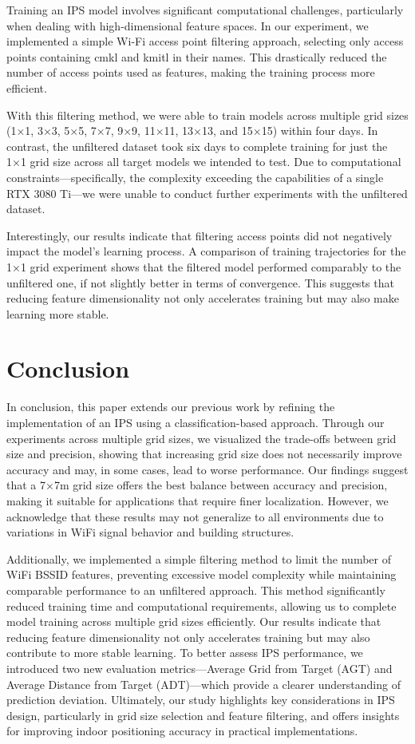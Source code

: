 \documentclass[conference]{IEEEtran}
\begin{document}
	Training an IPS model involves significant computational challenges, particularly when dealing with high-dimensional feature spaces. In our experiment, we implemented a simple Wi-Fi access point filtering approach, selecting only access points containing cmkl and kmitl in their names. This drastically reduced the number of access points used as features, making the training process more efficient.
	
	With this filtering method, we were able to train models across multiple grid sizes (1×1, 3×3, 5×5, 7×7, 9×9, 11×11, 13×13, and 15×15) within four days. In contrast, the unfiltered dataset took six days to complete training for just the 1×1 grid size across all target models we intended to test. Due to computational constraints—specifically, the complexity exceeding the capabilities of a single RTX 3080 Ti—we were unable to conduct further experiments with the unfiltered dataset.
	
	Interestingly, our results indicate that filtering access points did not negatively impact the model's learning process. A comparison of training trajectories for the 1×1 grid experiment shows that the filtered model performed comparably to the unfiltered one, if not slightly better in terms of convergence. This suggests that reducing feature dimensionality not only accelerates training but may also make learning more stable.
	
	
	
	\section{Conclusion}
	In conclusion, this paper extends our previous work by refining the implementation of an IPS using a classification-based approach. Through our experiments across multiple grid sizes, we visualized the trade-offs between grid size and precision, showing that increasing grid size does not necessarily improve accuracy and may, in some cases, lead to worse performance. Our findings suggest that a 7×7m grid size offers the best balance between accuracy and precision, making it suitable for applications that require finer localization. However, we acknowledge that these results may not generalize to all environments due to variations in WiFi signal behavior and building structures.
	
	Additionally, we implemented a simple filtering method to limit the number of WiFi BSSID features, preventing excessive model complexity while maintaining comparable performance to an unfiltered approach. This method significantly reduced training time and computational requirements, allowing us to complete model training across multiple grid sizes efficiently. Our results indicate that reducing feature dimensionality not only accelerates training but may also contribute to more stable learning. To better assess IPS performance, we introduced two new evaluation metrics—Average Grid from Target (AGT) and Average Distance from Target (ADT)—which provide a clearer understanding of prediction deviation. Ultimately, our study highlights key considerations in IPS design, particularly in grid size selection and feature filtering, and offers insights for improving indoor positioning accuracy in practical implementations.
	
\end{document}
